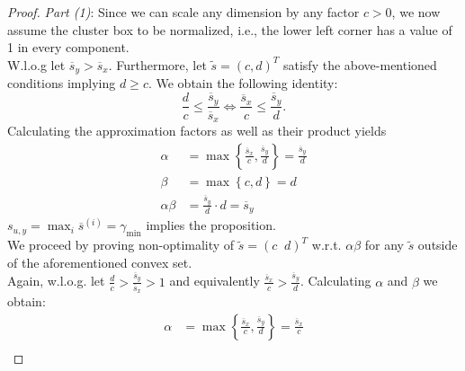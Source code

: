 \documentclass{article}
\begin{document}
\begin{proof}
	\emph{Part (1)}: Since we can scale any dimension by any factor $c>0$, we now assume the cluster box to be normalized, i.e., the lower left corner has a value of 1 in every component.\\
	W.l.o.g let $\overline{s}_y > \overline{s}_x$. Furthermore, let $\tilde{s} = (c, d)^T$ satisfy the above-mentioned conditions implying $d \geq c$. We obtain the following identity:
	\begin{equation*}
	\frac{d}{c} \leq \frac{\overline{s}_y}{\overline{s}_x} \iff \frac{\overline{s}_x}{c} \leq \frac{\overline{s}_y}{d}.
	\end{equation*}
	Calculating the approximation factors as well as their product yields
	\begin{align*}
	\alpha &= \max\left\{\frac{\overline{s}_x}{c}, \frac{\overline{s}_y}{d} \right\} = \frac{\overline{s}_y}{d}\\
	\beta &= \max\left\{c, d \right\} = d\\
	\alpha\beta &= \frac{\overline{s}_y}{d} \cdot d = \overline{s}_y
	\end{align*}
	$s_{u, y} = \max_{i}{\overline{s}^{(i)}} = \gamma_{\min}$ implies the proposition.\\
	We proceed by proving non-optimality of $\tilde{s}=(c \;\; d)^T$ w.r.t. $\alpha\beta$ for any $\tilde{s}$ outside of the aforementioned convex set.\\
	Again, w.l.o.g. let $\frac{d}{c} > \frac{\overline{s}_y}{\overline{s}_x} > 1$ and equivalently $\frac{\overline{s}_x}{c} > \frac{\overline{s}_y}{d}$. Calculating $\alpha$ and $\beta$ we obtain:
	\begin{align*}
	\alpha &= \max \left\{\frac{\overline{s}_x}{c}, \frac{\overline{s}_y}{d} \right\} = \frac{\overline{s}_x}{c}\\

\end{align*}
\end{proof}
\end{document}
